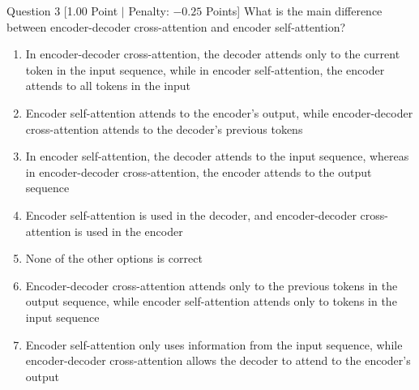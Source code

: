 \documentclass[11pt,a4paper]{article}
\begin{document}
\begin{questionbox}{Question 3 \hfill [1.00 Point $\vert$ Penalty: $-0.25$ Points]}
What is the main difference between encoder-decoder cross-attention and encoder self-attention?
\begin{enumerate}[label=\alph*.,leftmargin=2em]
    \item In encoder-decoder cross-attention, the decoder attends only to the current token in the input sequence, while in encoder self-attention, the encoder attends to all tokens in the input
    \item Encoder self-attention attends to the encoder's output, while encoder-decoder cross-attention attends to the decoder's previous tokens
    \item In encoder self-attention, the decoder attends to the input sequence, whereas in encoder-decoder cross-attention, the encoder attends to the output sequence
    \item Encoder self-attention is used in the decoder, and encoder-decoder cross-attention is used in the encoder
    \item None of the other options is correct
    \item Encoder-decoder cross-attention attends only to the previous tokens in the output sequence, while encoder self-attention attends only to tokens in the input sequence
    \item Encoder self-attention only uses information from the input sequence, while encoder-decoder cross-attention allows the decoder to attend to the encoder's output
\end{enumerate}
\end{questionbox}
\end{document}
